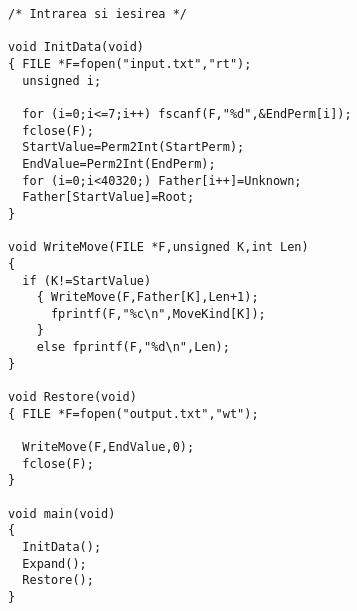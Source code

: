 \begin{verbatim}
/* Intrarea si iesirea */

void InitData(void)
{ FILE *F=fopen("input.txt","rt");
  unsigned i;

  for (i=0;i<=7;i++) fscanf(F,"%d",&EndPerm[i]);
  fclose(F);
  StartValue=Perm2Int(StartPerm);
  EndValue=Perm2Int(EndPerm);
  for (i=0;i<40320;) Father[i++]=Unknown;
  Father[StartValue]=Root;
}

void WriteMove(FILE *F,unsigned K,int Len)
{
  if (K!=StartValue)
    { WriteMove(F,Father[K],Len+1);
      fprintf(F,"%c\n",MoveKind[K]);
    }
    else fprintf(F,"%d\n",Len);
}

void Restore(void)
{ FILE *F=fopen("output.txt","wt");

  WriteMove(F,EndValue,0);
  fclose(F);
}

void main(void)
{
  InitData();
  Expand();
  Restore();
}
\end{verbatim}
